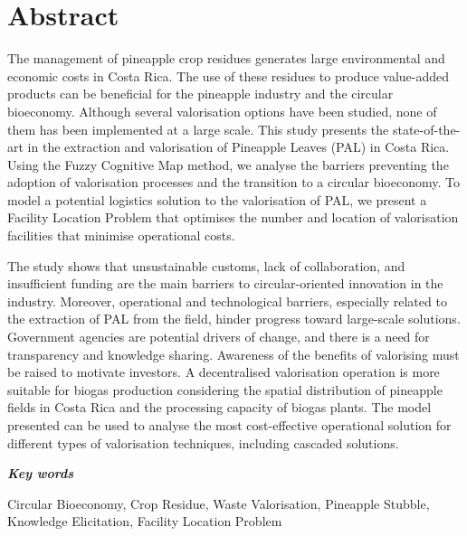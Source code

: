 \chapter*{Abstract}


\noindent The management of pineapple crop residues generates large environmental and economic costs in Costa Rica. The use of these residues to produce value-added products can be beneficial for the pineapple industry and the circular bioeconomy. Although several valorisation options have been studied, none of them has been implemented at a large scale. This study presents the state-of-the-art in the extraction and valorisation of Pineapple Leaves (PAL) in Costa Rica. Using the Fuzzy Cognitive Map method, we analyse the barriers preventing the adoption of valorisation processes and the transition to a circular bioeconomy. To model a potential logistics solution to the valorisation of PAL, we present a Facility Location Problem that optimises the number and location of valorisation facilities that minimise operational costs. 

\noindent The study shows that unsustainable customs, lack of collaboration, and insufficient funding are the main barriers to circular-oriented innovation in the industry. Moreover, operational and technological barriers, especially related to the extraction of PAL from the field, hinder progress toward large-scale solutions. Government agencies are potential drivers of change, and there is a need for transparency and knowledge sharing. Awareness of the benefits of valorising must be raised to motivate investors. A decentralised valorisation operation is more suitable for biogas production considering
the spatial distribution of pineapple fields in Costa Rica and the processing capacity of biogas plants. The model presented can be used to analyse the most cost-effective operational solution for different types of valorisation techniques, including cascaded solutions. 


\vspace{1cm}

\noindent \textit{\textbf{Key words}}

\noindent Circular Bioeconomy, Crop Residue, Waste Valorisation, Pineapple Stubble, Knowledge Elicitation, Facility Location Problem
